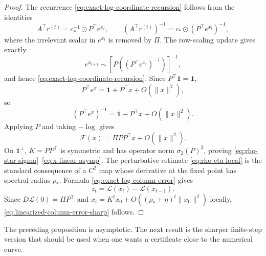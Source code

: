 \documentclass[11pt]{article}
\numberwithin{equation}{section}
\theoremstyle{plain}
\theoremstyle{definition}
\theoremstyle{remark}
\newcommand{\ones}{\mathbf{1}}
\begin{document}
\begin{proof}
The recurrence \eqref{eq:exact-log-coordinate-recursion} follows from the identities
\[
        A^\top r^{(t)}=c_*^{-1}\odot P^\top e^{x_t},
        \qquad
        (A^\top r^{(t)})^{-1}=c_*\odot(P^\top e^{x_t})^{-1},
\]
where the irrelevant scalar in $e^{x_t}$ is removed by $\Pi$. The row-scaling update gives exactly
\[
        e^{x_{t+1}}
        \sim
        \left[P\left((P^\top e^{x_t})^{-1}\right)\right]^{-1},
\]
and hence \eqref{eq:exact-log-coordinate-recursion}. Since $P^\top\ones=\ones$,
\[
        P^\top e^x=\ones+P^\top x+O(\|x\|^2),
\]
so
\[
        (P^\top e^x)^{-1}=\ones-P^\top x+O(\|x\|^2).
\]
Applying $P$ and taking $-\log$ gives
\[
        \mathcal F(x)=\Pi PP^\top x+O(\|x\|^2).
\]
On $\ones^\perp$, $K=PP^\top$ is symmetric and has operator norm $\sigma_2(P)^2$, proving \eqref{eq:rho-star-sigma}--\eqref{eq:x-linear-asymp}. The perturbative estimate \eqref{eq:rho-eta-local} is the standard consequence of a $C^2$ map whose derivative at the fixed point has spectral radius $\rho_*$. Formula \eqref{eq:exact-log-column-error} gives
\[
        z_t
        =
        \mathcal L(x_t)-\mathcal L(x_{t-1}).
\]
Since $D\mathcal L(0)=\Pi P^\top$ and $x_t=K^t x_0+O((\rho_*+\eta)^t\|x_0\|^2)$ locally, \eqref{eq:linearized-column-error-sharp} follows.
\end{proof}

The preceding proposition is asymptotic. The next result is the sharper finite-step version that should be used when one wants a certificate close to the numerical curve.
\end{document}

